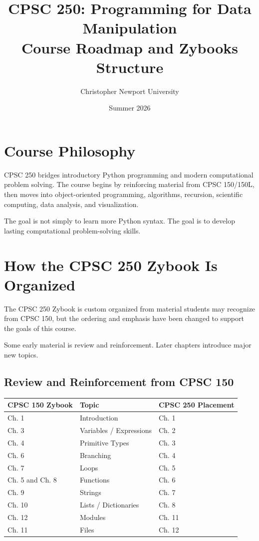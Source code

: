 \documentclass[11pt]{article}
\title{\textbf{CPSC 250: Programming for Data Manipulation}\\
\large Course Roadmap and Zybooks Structure}
\author{Christopher Newport University}
\date{Summer 2026}
\begin{document}
\maketitle

\section{Course Philosophy}

CPSC 250 bridges introductory Python programming and modern computational problem solving. The course begins by reinforcing material from CPSC 150/150L, then moves into object-oriented programming, algorithms, recursion, scientific computing, data analysis, and visualization.

The goal is not simply to learn more Python syntax. The goal is to develop lasting computational problem-solving skills.

\section{How the CPSC 250 Zybook Is Organized}

The CPSC 250 Zybook is custom organized from material students may recognize from CPSC 150, but the ordering and emphasis have been changed to support the goals of this course.

Some early material is review and reinforcement. Later chapters introduce major new topics.

\subsection*{\color{reviewGreen}Review and Reinforcement from CPSC 150}

\begin{center}
\renewcommand{\arraystretch}{1.25}
\begin{tabular}{p{} p{} p{}}
\toprule
\textbf{CPSC 150 Zybook} & \textbf{Topic} & \textbf{CPSC 250 Placement} \\
\midrule
Ch. 1 & Introduction & Ch. 1 \\
Ch. 3 & Variables / Expressions & Ch. 2 \\
Ch. 4 & Primitive Types & Ch. 3 \\
Ch. 6 & Branching & Ch. 4 \\
Ch. 7 & Loops & Ch. 5 \\
Ch. 5 and Ch. 8 & Functions & Ch. 6 \\
Ch. 9 & Strings & Ch. 7 \\
Ch. 10 & Lists / Dictionaries & Ch. 8 \\
Ch. 12 & Modules & Ch. 11 \\
Ch. 11 & Files & Ch. 12 \\
\bottomrule
\end{tabular}
\end{center}
\end{document}
